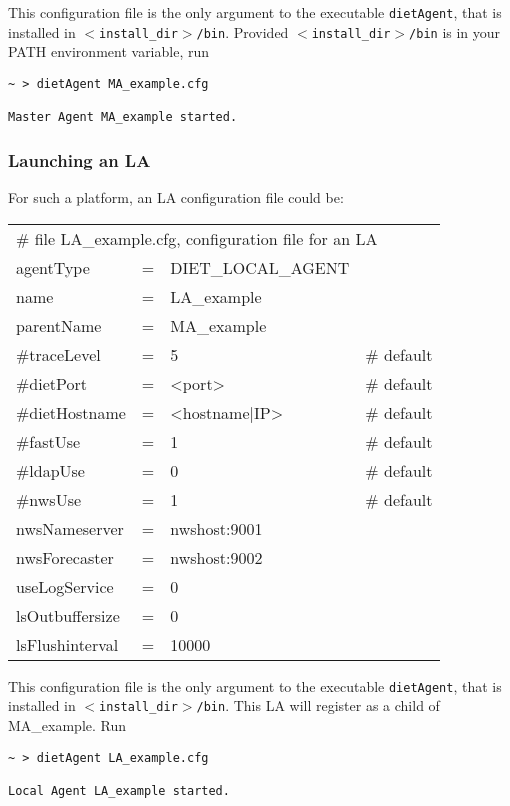 This configuration file is the only argument to the executable \texttt{dietAgent},
that is installed in \texttt{$<$install\_dir$>$/bin}. Provided
\texttt{$<$install\_dir$>$/bin} is in your PATH environment variable, run
{\footnotesize
\begin{verbatim}
~ > dietAgent MA_example.cfg

Master Agent MA_example started.
\end{verbatim}
}


\subsubsection{Launching an LA}

For such a platform, an LA configuration file could be:
\tt
\begin{center}
 \footnotesize
 \begin{tabular}{lcll}
  \multicolumn{4}{l}{\# file LA\_example.cfg, configuration file for an LA}\\
  agentType    &=&DIET\_LOCAL\_AGENT&\\
  name         &=&LA\_example       &\\
  parentName   &=&MA\_example       &\\
  \#traceLevel &=&5                 &\# default\\
  \#dietPort    &=&<port>             &\# default\\
  \#dietHostname&=&<hostname|IP>      &\# default\\
  \#fastUse    &=&1                 &\# default\\
  \#ldapUse    &=&0                 &\# default\\
  \#nwsUse     &=&1                 &\# default\\
  nwsNameserver&=&nwshost:9001      &\\
  nwsForecaster&=&nwshost:9002      &\\
  useLogService &=& 0                 &\\
  lsOutbuffersize &=& 0               &\\
  lsFlushinterval &=& 10000           &\\
 \end{tabular}
\end{center}
\rm

This configuration file is the only argument to the executable
\texttt{dietAgent}, that is installed in
\texttt{$<$install\_dir$>$/bin}. This LA will register as a child of
MA\_example. Run {\footnotesize
\begin{verbatim}
~ > dietAgent LA_example.cfg

Local Agent LA_example started.
\end{verbatim}
}

